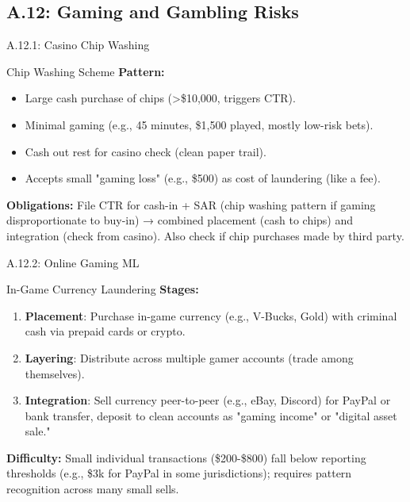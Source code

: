 \documentclass{beamer}
\begin{document}
	\subsection{A.12: Gaming and Gambling Risks}
	
	\begin{frame}{A.12.1: Casino Chip Washing}
		\begin{block}{Chip Washing Scheme}
			\textbf{Pattern:}
			\begin{itemize}
				\item Large cash purchase of chips (>\$10,000, triggers CTR).
				\item Minimal gaming (e.g., 45 minutes, \$1,500 played, mostly low-risk bets).
				\item Cash out rest for casino check (clean paper trail).
				\item Accepts small "gaming loss" (e.g., \$500) as cost of laundering (like a fee).
			\end{itemize}
		\end{block}
		\textbf{Obligations:} File CTR for cash-in + SAR (chip washing pattern if gaming disproportionate to buy-in) → combined placement (cash to chips) and integration (check from casino). Also check if chip purchases made by third party.
	\end{frame}
	
	\begin{frame}{A.12.2: Online Gaming ML}
		\begin{block}{In-Game Currency Laundering}
			\textbf{Stages:}
			\begin{enumerate}
				\item \textbf{Placement}: Purchase in-game currency (e.g., V-Bucks, Gold) with criminal cash via prepaid cards or crypto.
				\item \textbf{Layering}: Distribute across multiple gamer accounts (trade among themselves).
				\item \textbf{Integration}: Sell currency peer-to-peer (e.g., eBay, Discord) for PayPal or bank transfer, deposit to clean accounts as "gaming income" or "digital asset sale."
			\end{enumerate}
		\end{block}
		\textbf{Difficulty:} Small individual transactions (\$200-\$800) fall below reporting thresholds (e.g., \$3k for PayPal in some jurisdictions); requires pattern recognition across many small sells.
	\end{frame}
	
\end{document}
